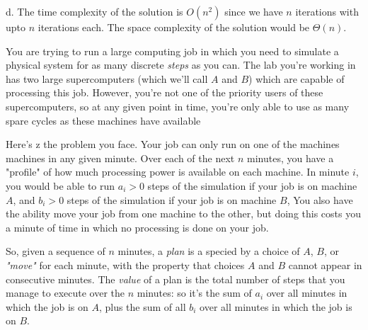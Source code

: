 \documentclass[12pt]{article}
\newenvironment{problem}[2][Problem]{\begin{trivlist}
\item[\hskip \labelsep {\bfseries #1}\hskip \labelsep {\bfseries #2.}]}{\end{trivlist}}
\begin{document}
d. The time complexity of the solution is $O(n^2)$ since we have $n$ iterations with upto $n$ iterations each. The space complexity of the solution would be $\Theta(n)$.
\begin{problem}{5}
   You are trying to run a large computing job in which you need to simulate a physical system for as many discrete \textit{steps} as you can. The lab you're working in has two large supercomputers (which we'll call $A$ and $B$) which are capable of processing this job. However, you're not one of the priority users of these supercomputers, so at any given point in time, you're only able to use as many spare cycles as these machines have available

   Here's   z the problem you face. Your job can only run on one of the machines machines in any given minute. Over each of the next $n$ minutes, you have a "profile" of how much processing power is available on each machine. In minute $i$, you would be able to run $a_i>0$ steps of the simulation if your job is on machine $A$, and $b_i>0$ steps of the simulation if your job is on machine $B$, You also have the ability move your job from one machine to the other, but doing this costs you a minute of time in which no processing is done on your job.

   So, given a sequence of $n$ minutes, a \textit{plan} is a specied by a choice of $A$, $B$, or \textit{"move"} for each minute, with the property that choices $A$ and $B$ cannot appear in consecutive minutes. The \textit{value} of a plan is the total number of steps that you manage to execute over the $n$ minutes: so it's the sum of $a_i$ over all minutes in which the job is on $A$, plus the sum of all $b_i$ over all minutes in which the job is on $B$.


\end{problem}
\end{document}

